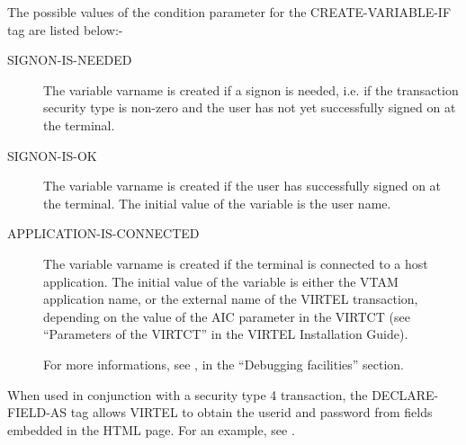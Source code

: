 \documentclass[letterpaper,10pt,english]{sphinxmanual}
\begin{document}
The possible values of the condition parameter for the CREATE-VARIABLE-IF tag are listed below:-
\begin{description}
\item[{SIGNON-IS-NEEDED}] \leavevmode
The variable varname is created if a signon is needed, i.e. if the
transaction security type is non-zero and the user has not yet
successfully signed on at the terminal.

\item[{SIGNON-IS-OK}] \leavevmode
The variable varname is created if the user has successfully signed
on at the terminal. The initial value of the variable is the user
name.

\item[{APPLICATION-IS-CONNECTED}] \leavevmode
The variable varname is created if the terminal is connected to a
host application. The initial value of the variable is either the
VTAM application name, or the external name of the VIRTEL
transaction, depending on the value of the AIC parameter in the
VIRTCT (see “Parameters of the VIRTCT” in the VIRTEL Installation
Guide).

For more informations, see {\hyperref[\detokenize{User_Guide:v457ug-debugging-create-variable}]{}}, in the “Debugging facilities” section.

\end{description}


When used in conjunction with a security type 4 transaction, the DECLARE-FIELD-AS tag allows VIRTEL to obtain the userid and password from fields embedded in the HTML page. For an example, see {\hyperref[\detokenize{User_Guide:v457ug-signon-using-html}]{}}.

\begin{sphinxVerbatim}[commandchars=\\\{\}]
  
\end{sphinxVerbatim}
\end{document}
